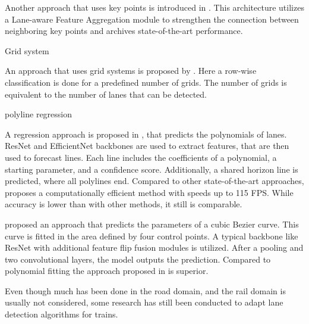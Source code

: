 Another approach that uses key points is introduced in \cite{GANet2022}.
This architecture utilizes a Lane-aware Feature Aggregation module to strengthen the connection between neighboring key points and archives state-of-the-art performance.

Grid system

An approach that uses grid systems is proposed by \cite{laneDetectionGrid2020}.
Here a row-wise classification is done for a predefined number of grids.
The number of grids is equivalent to the number of lanes that can be detected.

polyline regression

A regression approach is proposed in \cite{PolyLaneNetRoad2021}, that predicts the polynomials of lanes.
ResNet and EfficientNet backbones are used to extract features, that are then used to forecast lines.
Each line includes the coefficients of a polynomial, a starting parameter, and a confidence score.
Additionally, a shared horizon line is predicted, where all polylines end.
Compared to other state-of-the-art approaches, \cite{PolyLaneNetRoad2021} proposes a computationally efficient method with speeds up to 115 \ac{FPS}.
While accuracy is lower than with other methods, it still is comparable.

\cite{DetectingLanesWithBezierCurves2023} proposed an approach that predicts the parameters of a cubic Bezier curve.
This curve is fitted in the area defined by four control points.
A typical backbone like ResNet with additional feature flip fusion modules is utilized.
After a pooling and two convolutional layers, the model outputs the prediction.
Compared to polynomial fitting the approach proposed in \cite{DetectingLanesWithBezierCurves2023} is superior.


Even though much has been done in the road domain, and the rail domain is usually not considered, some research has still been conducted to adapt lane detection algorithms for trains.


